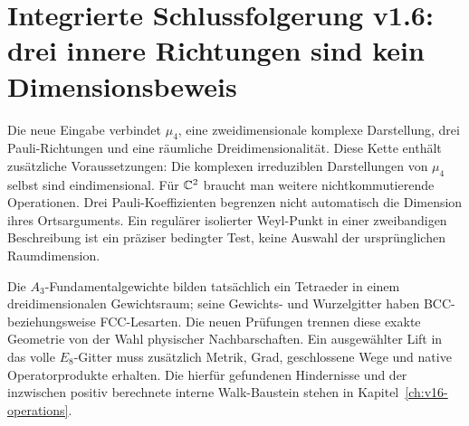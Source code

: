 \section{Integrierte Schlussfolgerung v1.6: drei innere Richtungen sind kein Dimensionsbeweis}
Die neue Eingabe verbindet $\mu_4$, eine zweidimensionale komplexe Darstellung, drei Pauli-Richtungen und eine räumliche Dreidimensionalität. Diese Kette enthält zusätzliche Voraussetzungen: Die komplexen irreduziblen Darstellungen von $\mu_4$ selbst sind eindimensional. Für $\mathbb C^2$ braucht man weitere nichtkommutierende Operationen. Drei Pauli-Koeffizienten begrenzen nicht automatisch die Dimension ihres Ortsarguments. Ein regulärer isolierter Weyl-Punkt in einer zweibandigen Beschreibung ist ein präziser bedingter Test, keine Auswahl der ursprünglichen Raumdimension.

Die $A_3$-Fundamentalgewichte bilden tatsächlich ein Tetraeder in einem dreidimensionalen Gewichtsraum; seine Gewichts- und Wurzelgitter haben BCC- beziehungsweise FCC-Lesarten. Die neuen Prüfungen trennen diese exakte Geometrie von der Wahl physischer Nachbarschaften. Ein ausgewählter Lift in das volle $E_8$-Gitter muss zusätzlich Metrik, Grad, geschlossene Wege und native Operatorprodukte erhalten. Die hierfür gefundenen Hindernisse und der inzwischen positiv berechnete interne Walk-Baustein stehen in Kapitel~\ref{ch:v16-operations}.
